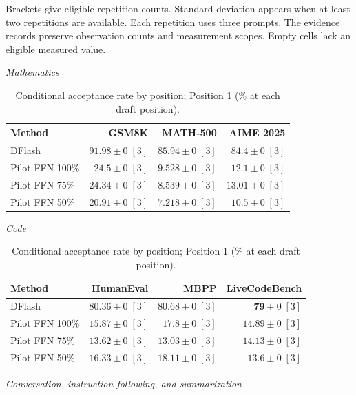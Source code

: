 \begin{table}[!htp]
\begin{minipage}{\linewidth}
Brackets give eligible repetition counts. Standard deviation appears when at least two repetitions are available. Each repetition uses three prompts. The evidence records preserve observation counts and measurement scopes. Empty cells lack an eligible measured value.
\end{minipage}
\end{table}

\begin{table}[!htp]
\centering\small
\setlength{\tabcolsep}{3pt}
\caption{Conditional acceptance rate by position; Position 1 (\% at each draft position).}
\label{tab:appendix-metric-conditional-acceptance-1}
\textit{Mathematics}\par\smallskip
\begin{tabular}{@{}>{\raggedright\arraybackslash}p{3.7cm}rrr@{}}
\toprule
Method & GSM8K & MATH-500 & AIME 2025 \\
\midrule
DFlash & \(\mathbf{91.98} \pm 0\;[3]\) & \(\mathbf{85.94} \pm 0\;[3]\) & \(\mathbf{84.4} \pm 0\;[3]\) \\
Pilot FFN 100\% & \(24.5 \pm 0\;[3]\) & \(9.528 \pm 0\;[3]\) & \(12.1 \pm 0\;[3]\) \\
Pilot FFN 75\% & \(24.34 \pm 0\;[3]\) & \(8.539 \pm 0\;[3]\) & \(13.01 \pm 0\;[3]\) \\
Pilot FFN 50\% & \(20.91 \pm 0\;[3]\) & \(7.218 \pm 0\;[3]\) & \(10.5 \pm 0\;[3]\) \\
\bottomrule
\end{tabular}\par\medskip
\textit{Code}\par\smallskip
\begin{tabular}{@{}>{\raggedright\arraybackslash}p{3.7cm}rrr@{}}
\toprule
Method & HumanEval & MBPP & LiveCodeBench \\
\midrule
DFlash & \(\mathbf{80.36} \pm 0\;[3]\) & \(\mathbf{80.68} \pm 0\;[3]\) & \(\mathbf{79} \pm 0\;[3]\) \\
Pilot FFN 100\% & \(15.87 \pm 0\;[3]\) & \(17.8 \pm 0\;[3]\) & \(14.89 \pm 0\;[3]\) \\
Pilot FFN 75\% & \(13.62 \pm 0\;[3]\) & \(13.03 \pm 0\;[3]\) & \(14.13 \pm 0\;[3]\) \\
Pilot FFN 50\% & \(16.33 \pm 0\;[3]\) & \(18.11 \pm 0\;[3]\) & \(13.6 \pm 0\;[3]\) \\
\bottomrule
\end{tabular}\par\medskip
\textit{Conversation, instruction following, and summarization}\par\smallskip

\end{table}
